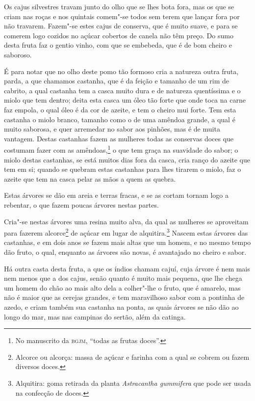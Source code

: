 Os cajus silvestres travam junto do olho que se lhes bota fora, mas os que se criam nas
roças e nos quintais comem"-se todos sem terem que lançar fora por não travarem. Fazem"-se
estes cajus de conserva, que é muito suave, e para se comerem logo cozidos no açúcar
cobertos de canela não têm preço. Do sumo desta fruta faz o gentio vinho, com que se
embebeda, que é de bom cheiro e saboroso.

É para notar que no olho deste pomo tão formoso cria a natureza outra fruta, parda, a que
chamamos castanha, que é da feição e tamanho de um rim de cabrito, a qual castanha tem a
casca muito dura e de natureza quentíssima e o miolo que tem dentro; deita esta casca um
óleo tão forte que onde toca na carne faz empola, o qual óleo é da cor de azeite, e tem o
cheiro mui forte. Tem esta castanha o miolo branco, tamanho como o de uma amêndoa grande,
a qual é muito saborosa, e quer arremedar no sabor aos pinhões, mas é de muita vantagem.
Destas castanhas fazem as mulheres todas as conservas doces que costumam fazer com as
amêndoas,\footnote{ No manuscrito da \textsc{bgjm}, ``todas as frutas doces''.} o que tem
graça na suavidade do sabor; o miolo destas castanhas, se está muitos dias fora da casca,
cria ranço do azeite que tem em si; quando se quebram estas castanhas para lhes tirarem o
miolo, faz o azeite que tem na casca pelar as mãos a quem as quebra.

Estas árvores se dão em areia e terras fracas, e se as cortam tornam logo a rebentar, o
que fazem poucas árvores nestas partes.

Cria"-se nestas árvores uma resina muito alva, da qual as mulheres se aproveitam para
fazerem alcorce\footnote{ Alcorce ou alcorça: massa de açúcar e farinha com a qual se
cobrem ou fazem diversos doces.} de açúcar em lugar de alquitira.\footnote{ Alquitira:
goma retirada da planta \textit{Astracantha gummifera} que pode ser usada na confecção de
doces.} Nascem estas árvores das castanhas, e em dois anos se fazem mais altas que um
homem, e no mesmo tempo dão fruto, o qual, enquanto as árvores são novas, é avantajado no
cheiro e sabor.

Há outra casta desta fruta, a que os índios chamam cajuí, cuja árvore é nem mais nem menos
que a dos cajus, senão quanto é muito mais pequena, que lhe chega um homem do chão ao mais
alto dela a colher"-lhe o fruto, que é amarelo, mas não é maior que as cerejas grandes, e
tem maravilhoso sabor com a pontinha de azedo, e criam também sua castanha na ponta, as
quais árvores se não dão ao longo do mar, mas nas campinas do sertão, além da catinga.

